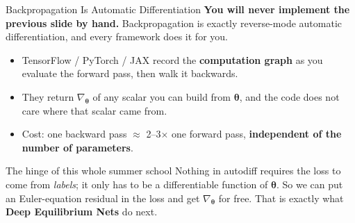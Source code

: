 \documentclass[aspectratio=169,11pt]{beamer}
\newcommand{\emphc}[1]{\textcolor{harvardcrimson}{#1}}
\begin{document}
\begin{frame}{Backpropagation Is Automatic Differentiation}
\textbf{You will never implement the previous slide by hand.}  Backpropagation is exactly \emphc{reverse-mode automatic differentiation}, and every framework does it for you.

\vspace{0.25cm}
\begin{itemize}\itemsep3pt
    \item TensorFlow / PyTorch / JAX record the \textbf{computation graph} as you evaluate the forward pass, then walk it backwards.
    \item They return $\nabla_{\bm{\theta}}$ of \emphc{any scalar} you can build from $\bm{\theta}$, and the code does not care where that scalar came from.
    \item Cost: one backward pass $\approx$ 2--3$\times$ one forward pass, \textbf{independent of the number of parameters}.
\end{itemize}

\vspace{0.25cm}
\begin{exampleblock}{The hinge of this whole summer school}
\small Nothing in autodiff requires the loss to come from \emph{labels}; it only has to be a differentiable function of $\bm{\theta}$.  So we can put an \emphc{Euler-equation residual} in the loss and get $\nabla_{\bm{\theta}}$ for free.  That is exactly what \textbf{Deep Equilibrium Nets} do next.
\end{exampleblock}
\end{frame}
\end{document}
